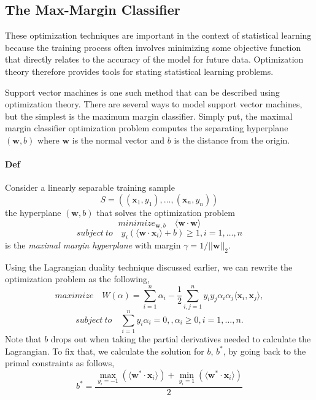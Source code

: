 \documentclass{article}
\newcommand{\bw}{\mathbf{w}}
\begin{document}
\subsection{The Max-Margin Classifier}
These optimization techniques are important in the context of statistical learning because the training process often involves minimizing some objective function that directly relates to the accuracy of the model for future data. Optimization theory therefore provides tools for stating statistical learning problems.

Support vector machines is one such method that can be described using optimization theory. There are several ways to model support vector machines, but the simplest is the maximum margin classifier. Simply put, the maximal margin classifier optimization problem computes the separating hyperplane $(\bw,b)$ where $\bw$ is the normal vector and $b$ is the distance from the origin.

\paragraph{Def} Consider a linearly separable training sample
$$ S = ((\mathbf{x}_1,y_1),\dots, (\mathbf{x}_n, y_n))$$
the hyperplane $(\bw, b)$ that solves the optimization problem
$$ minimize_{\bw, b} \quad \langle \bw \cdot \bw \rangle  $$
$$ subject\ to \quad y_i(\langle \bw \cdot \mathbf{x}_i \rangle + b) \geq 1, i = 1, \dots, n$$
is the \textit{maximal margin hyperplane} with margin $\gamma = 1/||\bw||_2$.

Using the Lagrangian duality technique discussed earlier, we can rewrite the optimization problem as the following, 
$$ maximize \quad W(\alpha) = \sum_{i=1}^n \alpha_i - \frac{1}{2}\sum_{i,j=1}^n y_i y_j \alpha_i \alpha_j  \langle \mathbf{x}_i, \mathbf{x}_j \rangle,$$
$$ subject\ to \quad \sum_{i=1}^n y_i \alpha_i = 0,, \alpha_i \geq 0, i=1,\dots,n.$$
Note that $b$ drops out when taking the partial derivatives needed to calculate the Lagrangian. To fix that, we calculate the solution for $b$, $b^*$, by going back to the primal constraints as follows,
    $$ b^* = \frac{\max_{y_i=-1}(\langle \bw^* \cdot \mathbf{x}_i \rangle)+ \min_{y_i=1}(\langle \bw^* \cdot \mathbf{x}_i\rangle)}{2}$$
    
\end{document}
